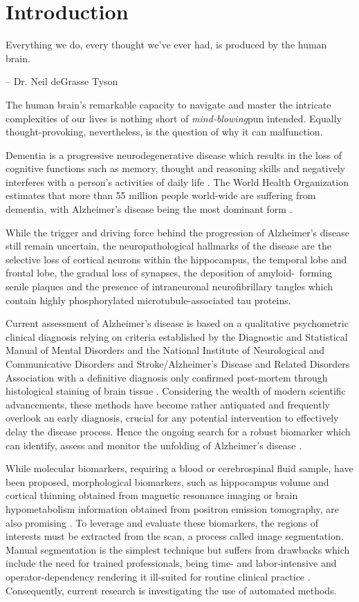 \section{Introduction}

\epigraph{Everything we do, every thought we've ever had, is produced by the human brain.}{-- Dr. Neil deGrasse Tyson}

The human brain's remarkable capacity to navigate and master the intricate complexities of our lives is nothing short of \emph{mind-blowing}\textemdash{}pun intended. Equally thought-provoking, nevertheless, is the question of why it can malfunction.

Dementia is a progressive neurodegenerative disease which results in the loss of cognitive functions such as memory, thought and reasoning skills and negatively interferes with a person's activities of daily life \cite{b1}. The World Health Organization estimates that more than 55 million people world-wide are suffering from dementia, with Alzheimer's disease being the most dominant form \cite{b2}. 

While the trigger and driving force behind the progression of Alzheimer's disease still remain uncertain, the neuropathological hallmarks of the disease are the selective loss of cortical neurons within the hippocampus, the temporal lobe and frontal lobe, the gradual loss of synapses, the deposition of amyloid-\textbeta\ forming senile plaques and the presence of intraneuronal neurofibrillary tangles which contain highly phosphorylated microtubule-associated tau proteins. \cite{b3,b4} 

Current assessment of Alzheimer's disease is based on a qualitative psychometric clinical diagnosis relying on criteria established by the Diagnostic and Statistical Manual of Mental Disorders and the National Institute of Neurological and Communicative Disorders and Stroke/Alzheimer's Disease and Related Disorders Association with a definitive diagnosis only confirmed post-mortem through histological staining of brain tissue \cite{b4,b5}. Considering the wealth of modern scientific advancements, these methods have become rather antiquated and frequently overlook an early diagnosis, crucial for any potential intervention to effectively delay the disease process. Hence the ongoing search for a robust biomarker which can identify, assess and monitor the unfolding of Alzheimer's disease \cite{b4}.

While molecular biomarkers, requiring a blood or cerebrospinal fluid sample, have been proposed, morphological biomarkers, such as hippocampus volume and cortical thinning obtained from magnetic resonance imaging or brain hypometabolism information obtained from positron emission tomography, are also promising \cite{b4,b5}. To leverage and evaluate these biomarkers, the regions of interests must be extracted from the scan, a process called image segmentation. Manual segmentation is the simplest technique but suffers from drawbacks which include the need for trained professionals, being time- and labor-intensive and operator-dependency rendering it ill-suited for routine clinical practice \cite{b6}. Consequently, current research is investigating the use of automated methods.

